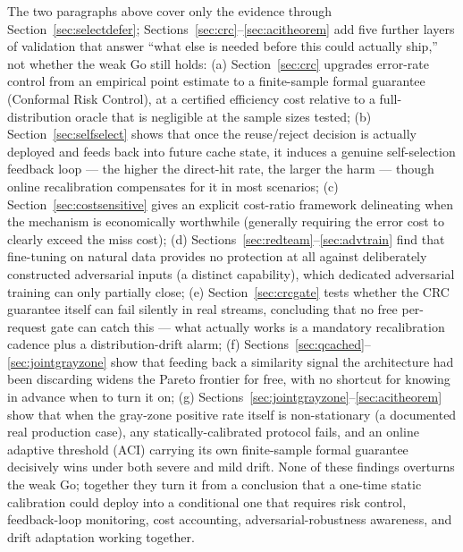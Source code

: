 \documentclass[11pt]{article}
\begin{document}
The two paragraphs above cover only the evidence through Section~\ref{sec:selectdefer}; Sections~\ref{sec:crc}--\ref{sec:acitheorem} add five further layers of validation that answer ``what else is needed before this could actually ship,'' not whether the weak Go still holds: (a) Section~\ref{sec:crc} upgrades error-rate control from an empirical point estimate to a finite-sample formal guarantee (Conformal Risk Control), at a certified efficiency cost relative to a full-distribution oracle that is negligible at the sample sizes tested; (b) Section~\ref{sec:selfselect} shows that once the reuse/reject decision is actually deployed and feeds back into future cache state, it induces a genuine self-selection feedback loop --- the higher the direct-hit rate, the larger the harm --- though online recalibration compensates for it in most scenarios; (c) Section~\ref{sec:costsensitive} gives an explicit cost-ratio framework delineating when the mechanism is economically worthwhile (generally requiring the error cost to clearly exceed the miss cost); (d) Sections~\ref{sec:redteam}--\ref{sec:advtrain} find that fine-tuning on natural data provides no protection at all against deliberately constructed adversarial inputs (a distinct capability), which dedicated adversarial training can only partially close; (e) Section~\ref{sec:crcgate} tests whether the CRC guarantee itself can fail silently in real streams, concluding that no free per-request gate can catch this --- what actually works is a mandatory recalibration cadence plus a distribution-drift alarm; (f) Sections~\ref{sec:qcached}--\ref{sec:jointgrayzone} show that feeding back a similarity signal the architecture had been discarding widens the Pareto frontier for free, with no shortcut for knowing in advance when to turn it on; (g) Sections~\ref{sec:jointgrayzone}--\ref{sec:acitheorem} show that when the gray-zone positive rate itself is non-stationary (a documented real production case), any statically-calibrated protocol fails, and an online adaptive threshold (ACI) carrying its own finite-sample formal guarantee decisively wins under both severe and mild drift. None of these findings overturns the weak Go; together they turn it from a conclusion that a one-time static calibration could deploy into a conditional one that requires risk control, feedback-loop monitoring, cost accounting, adversarial-robustness awareness, and drift adaptation working together.
\end{document}
